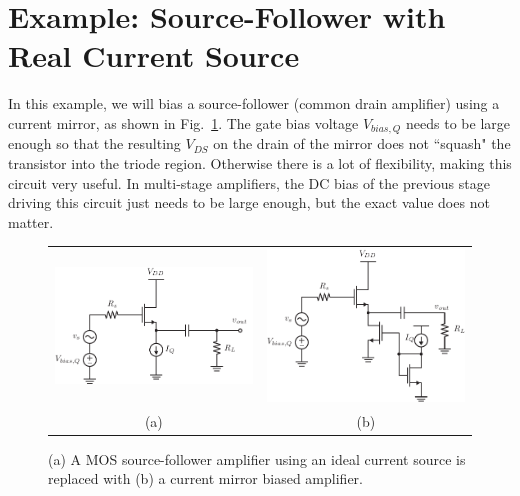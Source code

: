 \section{Example:  Source-Follower with Real Current Source}
In this example, we will bias a source-follower (common drain amplifier) using a current mirror, as shown in Fig.~\ref{fig:cd_amp_dc}.  The gate bias voltage $V_{bias,Q}$ needs to be large enough so that the resulting $V_{DS}$ on the drain of the mirror does not ``squash" the transistor into the triode region.  Otherwise there is a lot of flexibility, making this circuit very useful.  In multi-stage amplifiers, the DC bias of the previous stage driving this circuit just needs to be large enough, but the exact value does not matter.
\begin{figure}[tb]
\centering
\begin{tabular}{cc}
\includegraphics[scale=.8]{cd_amp_dc} &
\includegraphics[scale=.8]{cd_amp_dc_mirror}\\
(a) & (b)\\
\end{tabular}
\caption{(a) A MOS source-follower amplifier using an ideal current source is replaced with (b) a current mirror biased amplifier.}
\label{fig:cd_amp_dc}
\end{figure}
